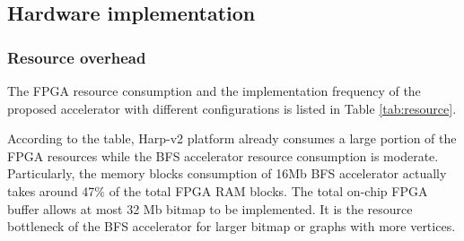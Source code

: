 %



\subsection{Hardware implementation}
\subsubsection{Resource overhead}
The FPGA resource consumption and the implementation frequency of 
the proposed accelerator with different configurations 
is listed in Table \ref{tab:resource}. 

According to the table, Harp-v2 platform already consumes 
a large portion of the FPGA resources while the BFS accelerator resource 
consumption is moderate. Particularly, the memory blocks consumption of 
16Mb BFS accelerator actually takes around 47\% of the total FPGA 
RAM blocks. The total on-chip FPGA buffer allows at most 32 Mb bitmap 
to be implemented. It is the resource bottleneck of the BFS 
accelerator for larger bitmap or graphs with more vertices.

